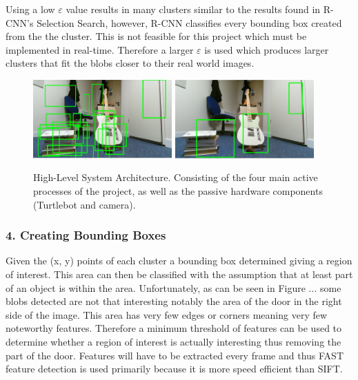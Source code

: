 \documentclass{mproj}
\begin{document}
 
Using a low $\varepsilon$  value results in many clusters similar to the results found in R-CNN's Selection Search, however, R-CNN classifies every bounding box created from the the cluster. This is not feasible for this project which must be implemented in real-time. Therefore a larger $\varepsilon$ is used which produces larger clusters that fit the blobs closer to their real world images.

\begin{figure}
   \caption{High-Level System Architecture. Consisting of the four main active processes of the project, as well as the passive hardware components (Turtlebot and camera).}
   \centering
   \includegraphics[width=0.475\textwidth]{images/many.png}
   \hfill
   \includegraphics[width=0.475\textwidth]{images/clusters.png}
\end{figure}



\subsubsection{4. Creating Bounding Boxes}

Given the (x, y) points of each cluster a bounding box determined giving a region of interest. This area can then be classified with the assumption that at least part of an object is within the area. Unfortunately, as can be seen in Figure ... some blobs detected are not that interesting notably the area of the door in the right side of the image. This area has very few edges or corners meaning very few noteworthy features. Therefore a minimum threshold of features can be used to determine whether a region of interest is actually interesting thus removing the part of the door. Features will have to be extracted every frame and thus FAST feature detection is used primarily because it is more speed efficient than SIFT.
\end{document}

